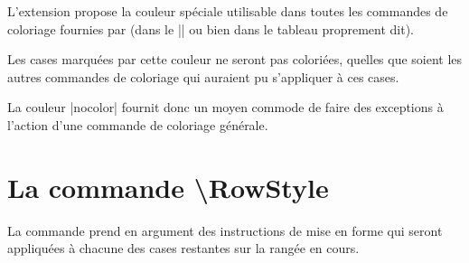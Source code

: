 \documentclass[dvipsnames]{article}%
\begin{document}

L'extension  propose la couleur spéciale 
utilisable dans toutes les commandes de coloriage fournies par 
(dans le |\CodeBefore| ou bien dans le tableau proprement dit).

Les cases marquées par cette couleur ne seront pas coloriées, quelles que soient
les autres commandes de coloriage qui auraient pu s'appliquer à ces cases. 

La couleur |nocolor| fournit donc un moyen commode de faire des exceptions à
l'action d'une commande de coloriage générale.


\section{La commande \textbackslash RowStyle}

\label{RowStyle}


La commande  prend en argument des instructions de
mise en forme qui seront appliquées à chacune des cases restantes sur la rangée
en cours.
\end{document}

